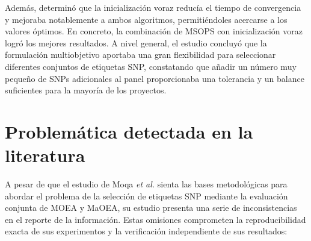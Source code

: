 Además, determinó que la inicialización voraz reducía el tiempo de convergencia y mejoraba notablemente a ambos algoritmos, permitiéndoles acercarse a los valores óptimos. En concreto, la combinación de MSOPS con inicialización voraz logró los mejores resultados. A nivel general, el estudio concluyó que la formulación multiobjetivo aportaba una gran flexibilidad para seleccionar diferentes conjuntos de etiquetas SNP, constatando que añadir un número muy pequeño de SNPs adicionales al panel proporcionaba una tolerancia y un balance suficientes para la mayoría de los proyectos.

\section{Problemática detectada en la literatura}

A pesar de que el estudio de Moqa \textit{et al.} \cite{moqa2022assessing} sienta las bases metodológicas para abordar el problema de la selección de etiquetas SNP mediante la evaluación conjunta de MOEA y MaOEA, su estudio presenta una serie de inconsistencias en el reporte de la información. Estas omisiones comprometen la reproducibilidad exacta de sus experimentos y la verificación independiente de sus resultados:

